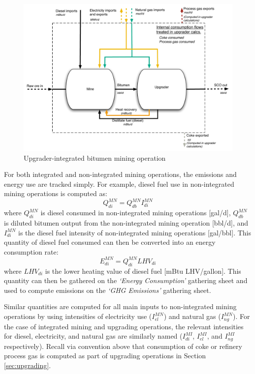 \documentclass[11pt]{report}
\newcommand{\sheet}[1]{\textit{`{#1}'}}
\begin{document}
\begin{figure}[t]
\includegraphics[width=1\columnwidth]{images/mining_int.pdf}
\caption{Upgrader-integrated bitumen mining operation}
\label{fig:pfd_mining_int}
\end{figure}

For both integrated and non-integrated mining operations, the emissions and energy use are tracked simply.  For example, diesel fuel use in non-integrated mining operations is computed as:
\begin{equation}\label{eq:dieselmine}
Q_{di}^{MN} = Q_{db}^{MN} I_{di}^{MN}
\end{equation}
where $Q_{di}^{MN}$ is diesel consumed in non-integrated mining operations [gal/d], $Q_{db}^{MN}$ is diluted bitumen output from the non-integrated mining operation [bbl/d], and $I_{di}^{MN}$ is the diesel fuel intensity of non-integrated mining operations [gal/bbl].  This quantity of diesel fuel consumed can then be converted into an energy consumption rate:
\begin{equation}
E_{di}^{MN} = Q_{di}^{MN} LHV_{di}
\end{equation}
where $LHV_{di}$ is the lower heating value of diesel fuel [mBtu LHV/gallon].  This quantity can then be gathered on the \sheet{Energy Consumption} gathering sheet and used to compute emissions on the \sheet{GHG Emissions} gathering sheet.

Similar quantities are computed for all main inputs to non-integrated mining operations by using intensities of electricity use ($I_{el}^{MN}$) and natural gas ($I_{ng}^{MN}$).  For the case of integrated mining and upgrading operations, the relevant intensities for diesel, electricity, and natural gas are similarly named ($I_{di}^{MI}$, $I_{el}^{MI}$, and $I_{ng}^{MI}$ respectively). Recall via convention above that consumption of coke or refinery process gas is computed as part of upgrading operations in Section \ref{sec:upgrading}.
\end{document}
